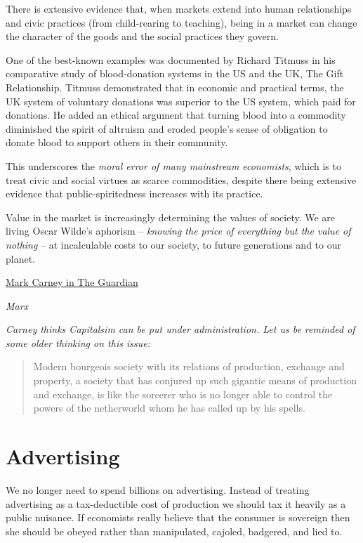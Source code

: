 \documentclass[
]{book}
\begin{document}
There is extensive evidence that, when markets extend into human relationships and civic practices (from child-rearing to teaching), being in a market can change the character of the goods and the social practices they govern.

One of the best-known examples was documented by Richard Titmuss in his comparative study of blood-donation systems in the US and the UK, The Gift Relationship. Titmuss demonstrated that in economic and practical terms, the UK system of voluntary donations was superior to the US system, which paid for donations. He added an ethical argument that turning blood into a commodity diminished the spirit of altruism and eroded people's sense of obligation to donate blood to support others in their community.

This underscores the \emph{moral error of many mainstream economists}, which is to treat civic and social virtues as scarce commodities, despite there being extensive evidence that public-spiritedness increases with its practice.

Value in the market is increasingly determining the values of society. We are living Oscar Wilde's aphorism -- \emph{knowing the price of everything but the value of nothing} -- at incalculable costs to our society, to future generations and to our planet.

\href{https://www.theguardian.com/business/2021/mar/13/crisis-in-values-exclusive-extract-mark-carneys-book}{Mark Carney in The Guardian}

\emph{Marx}

\emph{Carney thinks Capitalsim can be put under administration.
Let us be reminded of some older thinking on this issue:}

\begin{quote}
Modern bourgeois society with its relations of production, exchange and property, a society that has conjured up such gigantic means of production and exchange, is like the sorcerer who is no longer able to control the powers of the netherworld whom he has called up by his spells.
\end{quote}

\hypertarget{advertising}{%
\section{Advertising}\label{advertising}}

We no
longer need to spend billions on advertising. Instead of treating advertising as a tax-deductible cost of production we
should tax it heavily as a public nuisance. If economists really believe that the consumer is sovereign then she should
be obeyed rather than manipulated, cajoled, badgered, and lied to.
\end{document}

